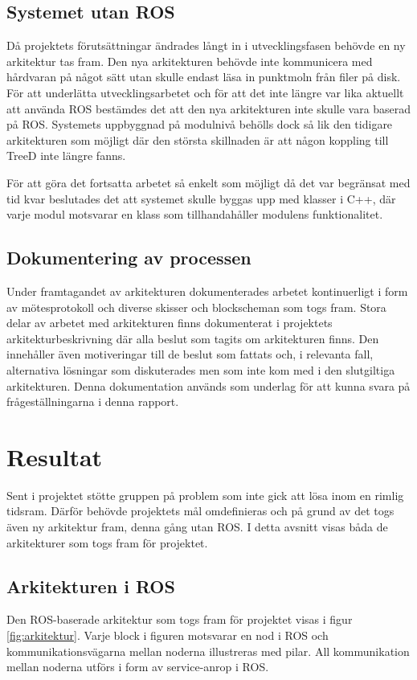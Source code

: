 \subsection{Systemet utan ROS}
Då projektets förutsättningar ändrades långt in i utvecklingsfasen behövde en ny arkitektur tas fram. Den nya arkitekturen behövde inte kommunicera med hårdvaran på något sätt utan skulle endast läsa in punktmoln från filer på disk. För att underlätta utvecklingsarbetet och för att det inte längre var lika aktuellt att använda ROS bestämdes det att den nya arkitekturen inte skulle vara baserad på ROS. Systemets uppbyggnad på modulnivå behölls dock så lik den tidigare arkitekturen som möjligt där den största skillnaden är att någon koppling till TreeD inte längre fanns.

För att göra det fortsatta arbetet så enkelt som möjligt då det var begränsat med tid kvar beslutades det att systemet skulle byggas upp med klasser i C++, där varje modul motsvarar en klass som tillhandahåller modulens funktionalitet.

\subsection{Dokumentering av processen}
Under framtagandet av arkitekturen dokumenterades arbetet kontinuerligt i form av mötesprotokoll och diverse skisser och blockscheman som togs fram. Stora delar av arbetet med arkitekturen finns dokumenterat i projektets arkitekturbeskrivning där alla beslut som tagits om arkitekturen finns. Den innehåller även motiveringar till de beslut som fattats och, i relevanta fall, alternativa lösningar som diskuterades men som inte kom med i den slutgiltiga arkitekturen. Denna dokumentation används som underlag för att kunna svara på frågeställningarna i denna rapport.


\section{Resultat}
\label{sec:results-lundberg}

Sent i projektet stötte gruppen på problem som inte gick att lösa inom en rimlig tidsram. Därför behövde projektets mål omdefinieras och på grund av det togs även ny arkitektur fram, denna gång utan ROS. I detta avsnitt visas båda de arkitekturer som togs fram för projektet.

\subsection{Arkitekturen i ROS}
Den ROS-baserade arkitektur som togs fram för projektet visas i figur \ref{fig:arkitektur}. Varje block i figuren motsvarar en nod i ROS och kommunikationsvägarna mellan noderna illustreras med pilar. All kommunikation mellan noderna utförs i form av service-anrop i ROS.

